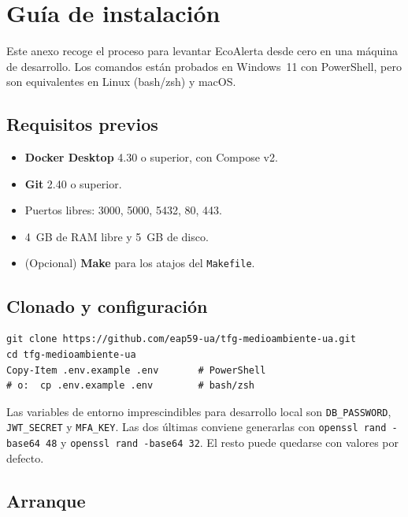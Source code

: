 \chapter{Guía de instalación}
\label{app:instalacion}

Este anexo recoge el proceso para levantar EcoAlerta desde cero en una máquina de desarrollo. Los comandos están probados en Windows~11 con PowerShell, pero son equivalentes en Linux (bash/zsh) y macOS.


\section*{Requisitos previos}

\begin{itemize}
  \item \textbf{Docker Desktop} 4.30 o superior, con Compose v2.
  \item \textbf{Git} 2.40 o superior.
  \item Puertos libres: 3000, 5000, 5432, 80, 443.
  \item 4~GB de RAM libre y 5~GB de disco.
  \item (Opcional) \textbf{Make} para los atajos del \texttt{Makefile}.
\end{itemize}


\section*{Clonado y configuración}

\begin{verbatim}
git clone https://github.com/eap59-ua/tfg-medioambiente-ua.git
cd tfg-medioambiente-ua
Copy-Item .env.example .env       # PowerShell
# o:  cp .env.example .env        # bash/zsh
\end{verbatim}

Las variables de entorno imprescindibles para desarrollo local son \texttt{DB\_PASSWORD}, \texttt{JWT\_SECRET} y \texttt{MFA\_KEY}. Las dos últimas conviene generarlas con \texttt{openssl rand -base64 48} y \texttt{openssl rand -base64 32}. El resto puede quedarse con valores por defecto.


\section*{Arranque}


